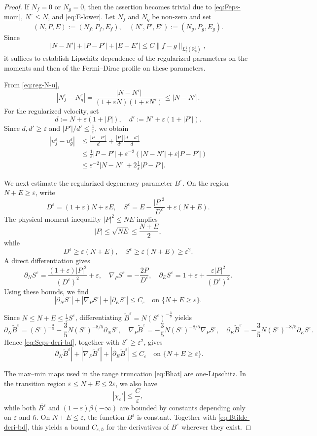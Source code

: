 \documentclass[10pt,reqno]{amsart}
\numberwithin{equation}{section}
\theoremstyle{definition}
\newcommand{\R}{\mathbb R}
\newcommand{\e}{\varepsilon}
\newcommand{\bq}{\begin{equation}}
\newcommand{\eq}{\end{equation}}
\newcommand{\lt}{\left}
\newcommand{\rt}{\right}
\newcommand{\pa}{\partial}
\begin{document}
\begin{proof}
If $N_f=0$ or $N_g=0$, then the assertion becomes trivial due to \eqref{eq:Feps-mom},  $N^\e\leq N$, and \eqref{eq:E-lower}. Let $N_f$ and $N_g$ be non-zero and set 
\[
 (N,P,E):=(N_f,P_f,E_f),  \quad  (N',P',E'):=(N_g,P_g,E_g).
\]
Since
\[
 |N-N'|+|P-P'|+|E-E'| \leq C\|f-g\|_{L^1_2(\R^3_p)},
\]
it suffices to establish Lipschitz dependence of the regularized parameters on the moments and then of the Fermi--Dirac profile on these parameters.

From \eqref{eq:reg-N-u},
\[
 |N_f^\e-N_g^\e|  =\frac{|N-N'|}{(1+\e N)(1+\e N')}  \leq |N-N'|.
\]
For the regularized velocity, set
\[
 d:=N+\e(1+|P|),  \quad  d':=N'+\e(1+|P'|).
\]
Since $d,d'\geq\e$ and $|P'|/d'\leq\frac1\e$, we obtain
\begin{align*}
 |u_f^\e-u_g^\e|  &\leq  \frac{|P-P'|}{d}  +\frac{|P'|}{d'}\frac{|d-d'|}{d} \\
 &\leq  \frac1\e|P-P'|  +\e^{-2}\lt(|N-N'|+\e|P-P'|\rt) \\
 &\leq  \e^{-2}|N-N'|  +2\frac1\e|P-P'|.
\end{align*}

We next estimate the regularized degeneracy parameter $B^\e$. On the region $N+E\geq\e$, write
\[
 D^\e=(1+\e)N+\e E,  \quad  S^\e  =E-\frac{|P|^2}{D^\e}+\e(N+E).
\]
The physical moment inequality $ |P|^2\leq NE$ implies
\[
 |P|\leq\sqrt{NE}\leq\frac{N+E}{2},
\]
while
\[
 D^\e\geq\e(N+E),  \quad  S^\e\geq\e(N+E)\geq\e^2.
\]
A direct differentiation gives
\[
 \pa_N S^\e  =  \frac{(1+\e)|P|^2}{(D^\e)^2}+\e,  \quad  \nabla_P S^\e  =  -\frac{2P}{D^\e}, \quad  \pa_E S^\e  =  1+\e+\frac{\e|P|^2}{(D^\e)^2}.
\]
Using these bounds, we find
\bq \label{eq:Seps-deri-bd}
 |\pa_N S^\e|  +|\nabla_P S^\e|  +|\pa_E S^\e|  \leq C_\e  \quad\text{on }\{N+E\geq\e\}.
\eq

Since $N\leq N+E\leq\frac1\e S^\e$, differentiating $\widetilde B^\e  =N(S^\e)^{-\frac35}$ yields
\[
 \pa_N\widetilde B^\e   =  (S^\e)^{-\frac35}  -\frac35N(S^\e)^{-8/5}\pa_NS^\e,\quad \nabla_P\widetilde B^\e =  -\frac35N(S^\e)^{-8/5}\nabla_PS^\e,\quad  \pa_E\widetilde B^\e =  -\frac35N(S^\e)^{-8/5}\pa_ES^\e.
\]
Hence \eqref{eq:Seps-deri-bd}, together with $S^\e\geq\e^2$, gives
\bq \label{eq:Btilde-deri-bd}
 |\pa_N\widetilde B^\e|  +|\nabla_P\widetilde B^\e|  +|\pa_E\widetilde B^\e|  \leq C_\e  \quad\text{on }\{N+E\geq\e\}.
\eq

The max--min maps used in the range truncation \eqref{eq:Bhat} are one-Lipschitz.  In the transition region $ \e\leq N+E\leq2\e$, we also have
\[
 |\chi_\e'|\leq\frac{C}{\e},
\]
while both $\overline{B^\e}$ and $(1-\e)\beta(-\infty)$ are bounded by constants depending only on $\e$ and $\hbar$.  On $N+E\leq\e$, the function $B^\e$ is constant.   Together with \eqref{eq:Btilde-deri-bd}, this yields a bound $C_{\e,\hbar}$ for the derivatives of $B^\e$ wherever they exist.


\end{proof}
\end{document}
